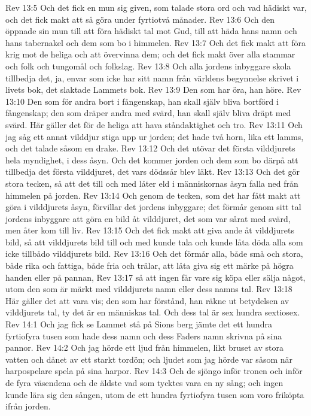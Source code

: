 Rev 13:5  Och det fick en mun sig given, som talade stora ord och vad hädiskt var, och det fick makt att så göra under fyrtiotvå månader.
Rev 13:6  Och den öppnade sin mun till att föra hädiskt tal mot Gud, till att häda hans namn och hans tabernakel och dem som bo i himmelen.
Rev 13:7  Och det fick makt att föra krig mot de heliga och att övervinna dem; och det fick makt över alla stammar och folk och tungomål och folkslag.
Rev 13:8  Och alla jordens inbyggare skola tillbedja det, ja, envar som icke har sitt namn från världens begynnelse skrivet i livets bok, det slaktade Lammets bok.
Rev 13:9  Den som har öra, han höre.
Rev 13:10  Den som för andra bort i fångenskap, han skall själv bliva bortförd i fångenskap; den som dräper andra med svärd, han skall själv bliva dräpt med svärd. Här gäller det för de heliga att hava ståndaktighet och tro.
Rev 13:11  Och jag såg ett annat vilddjur stiga upp ur jorden; det hade två horn, lika ett lamms, och det talade såsom en drake.
Rev 13:12  Och det utövar det första vilddjurets hela myndighet, i dess åsyn. Och det kommer jorden och dem som bo därpå att tillbedja det första vilddjuret, det vars dödssår blev läkt.
Rev 13:13  Och det gör stora tecken, så att det till och med låter eld i människornas åsyn falla ned från himmelen på jorden.
Rev 13:14  Och genom de tecken, som det har fått makt att göra i vilddjurets åsyn, förvillar det jordens inbyggare; det förmår genom sitt tal jordens inbyggare att göra en bild åt vilddjuret, det som var sårat med svärd, men åter kom till liv.
Rev 13:15  Och det fick makt att giva ande åt vilddjurets bild, så att vilddjurets bild till och med kunde tala och kunde låta döda alla som icke tillbådo vilddjurets bild.
Rev 13:16  Och det förmår alla, både små och stora, både rika och fattiga, både fria och trälar, att låta giva sig ett märke på högra handen eller på pannan,
Rev 13:17  så att ingen får vare sig köpa eller sälja något, utom den som är märkt med vilddjurets namn eller dess namns tal.
Rev 13:18  Här gäller det att vara vis; den som har förstånd, han räkne ut betydelsen av vilddjurets tal, ty det är en människas tal. Och dess tal är sex hundra sextiosex.
Rev 14:1  Och jag fick se Lammet stå på Sions berg jämte det ett hundra fyrtiofyra tusen som hade dess namn och dess Faders namn skrivna på sina pannor.
Rev 14:2  Och jag hörde ett ljud från himmelen, likt bruset av stora vatten och dånet av ett starkt tordön; och ljudet som jag hörde var såsom när harpospelare spela på sina harpor.
Rev 14:3  Och de sjöngo inför tronen och inför de fyra väsendena och de äldste vad som tycktes vara en ny sång; och ingen kunde lära sig den sången, utom de ett hundra fyrtiofyra tusen som voro friköpta ifrån jorden.
